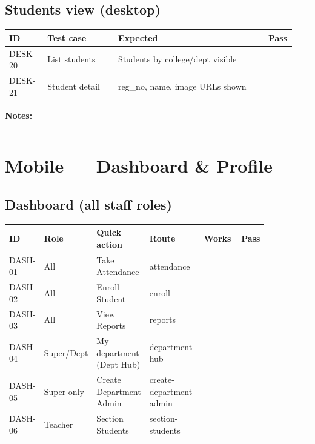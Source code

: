 \documentclass[11pt,a4paper,oneside]{article}
\newcommand{\chk}{\fbox{\rule{0pt}{1.05ex}\rule{1.05ex}{0pt}}}
\newcommand{\fillinlong}{\rule{0.72\textwidth}{0.4pt}}
\newcommand{\notesblock}{\par\smallskip\noindent\textbf{Notes:}\ \fillinlong\par\smallskip}
\newcommand{\tcheadfour}{%
  \toprule
  \textbf{ID} & \textbf{Test case} & \textbf{Expected} & \textbf{Pass} \\
  \midrule
}
\newcommand{\tcheadsix}{%
  \toprule
  \textbf{ID} & \textbf{Role} & \textbf{Quick action} & \textbf{Route} & \textbf{Works} & \textbf{Pass} \\
  \midrule
}
\begin{document}
\subsection{Students view (desktop)}

\small
\begin{tabular}{@{}>{\raggedright\arraybackslash}p{0.13\linewidth} >{\raggedright\arraybackslash}p{0.24\linewidth} >{\raggedright\arraybackslash}p{0.51\linewidth} >{\centering\arraybackslash}p{0.06\linewidth}@{}}
  \tcheadfour
  DESK-20 & List students   & Students by college/dept visible     & \chk \\
  DESK-21 & Student detail  & reg\_no, name, image URLs shown      & \chk \\
  \bottomrule
\end{tabular}
\normalsize

\notesblock

\section{Mobile — Dashboard \& Profile}

\subsection{Dashboard (all staff roles)}

\small
\begin{tabular}{@{}>{\raggedright\arraybackslash}p{0.09\linewidth} >{\raggedright\arraybackslash}p{0.12\linewidth} >{\raggedright\arraybackslash}p{0.18\linewidth} >{\raggedright\arraybackslash}p{0.22\linewidth} >{\raggedright\arraybackslash}p{0.18\linewidth} >{\centering\arraybackslash}p{0.06\linewidth}@{}}
  \tcheadsix
  DASH-01 & All         & Take Attendance              & attendance              & & \chk \\
  DASH-02 & All         & Enroll Student               & enroll                  & & \chk \\
  DASH-03 & All         & View Reports                 & reports                 & & \chk \\
  DASH-04 & Super/Dept  & My department (Dept Hub)     & department-hub          & & \chk \\
  DASH-05 & Super only  & Create Department Admin      & create-department-admin & & \chk \\
  DASH-06 & Teacher     & Section Students             & section-students        & & \chk \\
  \bottomrule
\end{tabular}
\normalsize
\end{document}
